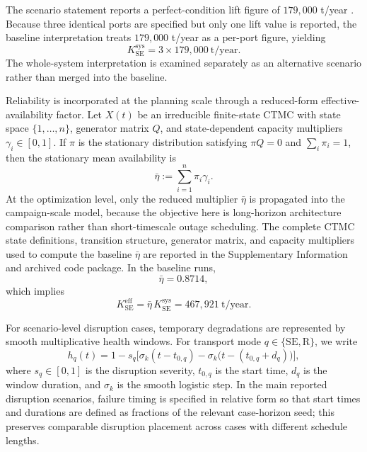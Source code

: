 \documentclass[12pt]{article}
\begin{document}
The scenario statement reports a perfect-condition lift figure of $179{,}000$ t/year \cite{COMAP2026B}. Because three identical ports are specified but only one lift value is reported, the baseline interpretation treats $179{,}000$ t/year as a per-port figure, yielding
\begin{equation}
	K_{\mathrm{SE}}^{\mathrm{sys}} = 3\times 179{,}000\ \text{t/year}.
	\label{eq:Ksys_methods}
\end{equation}
The whole-system interpretation is examined separately as an alternative scenario rather than merged into the baseline.

Reliability is incorporated at the planning scale through a reduced-form effective-availability factor. Let $X(t)$ be an irreducible finite-state CTMC with state space $\{1,\dots,n\}$, generator matrix $Q$, and state-dependent capacity multipliers $\gamma_i\in[0,1]$. If $\pi$ is the stationary distribution satisfying $\pi Q=0$ and $\sum_i \pi_i=1$, then the stationary mean availability is
\begin{equation}
	\bar{\eta}:=\sum_{i=1}^{n}\pi_i\gamma_i.
	\label{eq:eta_bar_methods}
\end{equation}
At the optimization level, only the reduced multiplier $\bar{\eta}$ is propagated into the campaign-scale model, because the objective here is long-horizon architecture comparison rather than short-timescale outage scheduling. The complete CTMC state definitions, transition structure, generator matrix, and capacity multipliers used to compute the baseline $\bar{\eta}$ are reported in the Supplementary Information and archived code package. In the baseline runs,
\[
\bar{\eta}=0.8714,
\]
which implies
\[
K_{\mathrm{SE}}^{\mathrm{eff}}
=\bar{\eta}\,K_{\mathrm{SE}}^{\mathrm{sys}}
=467{,}921\ \text{t/year}.
\]

For scenario-level disruption cases, temporary degradations are represented by smooth multiplicative health windows. For transport mode $q\in\{\mathrm{SE},\mathrm{R}\}$, we write
\begin{equation}
	h_q(t)=1-s_q\Big[\sigma_k(t-t_{0,q})-\sigma_k\big(t-(t_{0,q}+d_q)\big)\Big],
	\label{eq:health_window_methods}
\end{equation}
where $s_q\in[0,1]$ is the disruption severity, $t_{0,q}$ is the start time, $d_q$ is the window duration, and $\sigma_k$ is the smooth logistic step. In the main reported disruption scenarios, failure timing is specified in relative form so that start times and durations are defined as fractions of the relevant case-horizon seed; this preserves comparable disruption placement across cases with different schedule lengths.
\end{document}
